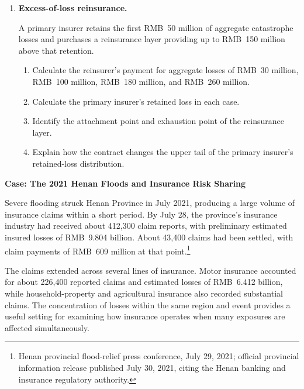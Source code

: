 \begin{enumerate}
\item \textbf{Excess-of-loss reinsurance.}

A primary insurer retains the first RMB~50 million of aggregate catastrophe losses and purchases a reinsurance layer providing up to RMB~150 million above that retention.

\begin{enumerate}

\item Calculate the reinsurer's payment for aggregate losses of RMB~30 million, RMB~100 million, RMB~180 million, and RMB~260 million.

\item Calculate the primary insurer's retained loss in each case.

\item Identify the attachment point and exhaustion point of the reinsurance layer.

\item Explain how the contract changes the upper tail of the primary insurer's retained-loss distribution.

\end{enumerate}

\end{enumerate}





\textbf{Case: The 2021 Henan Floods and Insurance Risk Sharing}

Severe flooding struck Henan Province in July 2021, producing a large volume of insurance claims within a short period. By July 28, the province's insurance industry had received about 412,300 claim reports, with preliminary estimated insured losses of RMB~9.804 billion. About 43,400 claims had been settled, with claim payments of RMB~609 million at that point.\footnote{Henan provincial flood-relief press conference, July 29, 2021; official provincial information release published July 30, 2021, citing the Henan banking and insurance regulatory authority.}

The claims extended across several lines of insurance. Motor insurance accounted for about 226,400 reported claims and estimated losses of RMB~6.412 billion, while household-property and agricultural insurance also recorded substantial claims. The concentration of losses within the same region and event provides a useful setting for examining how insurance operates when many exposures are affected simultaneously.

